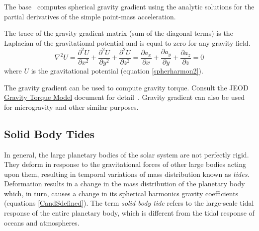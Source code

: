 The base \ModelDesc\ computes spherical gravity gradient using the analytic
solutions for the partial derivatives of the simple point-mass acceleration.

The trace of the gravity gradient matrix (sum of the diagonal terms) is the
Laplacian of the gravitational potential and is equal to zero for any
gravity field.
\begin{equation}
\nabla^2 U = \frac{\partial^2U}{\partial x^2}+\frac{\partial^2U}{\partial y^2}+\frac{\partial^2U}{\partial z^2} =
\frac{\partial a_x}{\partial x}+\frac{\partial a_y}{\partial y}+\frac{\partial a_z}{\partial z} = 0
\end{equation}
where $U$ is the gravitational potential (equation \ref{spherharmon2}).

The gravity gradient can be used to compute gravity torque. Consult the JEOD
\hyperref{file:\JEODHOME/models/interactions/gravity_torque/docs/gravity_torque.pdf}{part1}{reqt}
{Gravity Torque Model} document for detail~\cite{dynenv:gravitytorque}. Gravity
gradient can also be used for microgravity and other similar purposes.


\subsection{Solid Body Tides}
In general, the large planetary bodies of the solar system are not perfectly
rigid. They deform in response to the gravitational forces of other large
bodies acting upon them, resulting in temporal variations of mass
distribution known as {\it tides}. Deformation results in a change in the mass
distribution of the planetary body which, in turn, causes a change in its
spherical harmonics gravity coefficients (equations \ref{CandSdefined}).
The term {\it solid body tide} refers to the large-scale tidal response of
the entire planetary body, which is different from the tidal response of
oceans and atmospheres.

